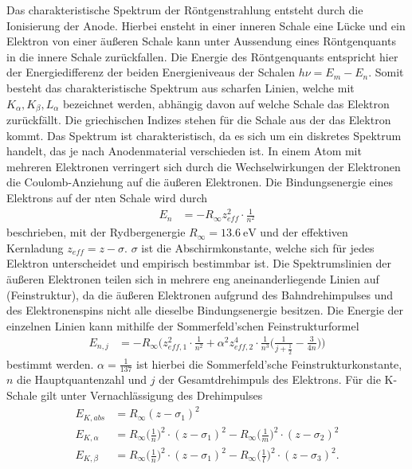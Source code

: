 Das charakteristische Spektrum der Röntgenstrahlung entsteht durch die Ionisierung der Anode.
Hierbei ensteht in einer inneren Schale eine Lücke und ein Elektron von einer äußeren Schale kann unter Aussendung eines Röntgenquants
in die innere Schale zurückfallen. Die Energie des Röntgenquants entspricht hier der Energiedifferenz der beiden Energieniveaus der Schalen
$h \nu = E_m-E_n$. Somit besteht das charakteristische Spektrum aus scharfen Linien, welche mit $K_\alpha, K_\beta, L_\alpha$ bezeichnet werden,
abhängig davon auf welche Schale das Elektron zurückfällt. Die griechischen Indizes stehen für die Schale aus der das Elektron kommt.
Das Spektrum ist charakteristisch, da es sich um ein diskretes Spektrum handelt, das je nach Anodenmaterial verschieden ist.
In einem Atom mit mehreren Elektronen verringert sich durch die Wechselwirkungen der Elektronen die Coulomb-Anziehung auf die äußeren
Elektronen. Die Bindungsenergie eines Elektrons auf der nten Schale wird durch 
\begin{align}
    E_n &= -R_\infty z_{eff}^2 \cdot \frac{1}{n^2} \label{eqn:Bindungsenergie}
\end{align}
beschrieben, mit der Rydbergenergie $R_\infty = \qty{13.6}{\electronvolt}$ und der effektiven Kernladung $z_{eff} = z - \sigma$.
$\sigma$ ist die Abschirmkonstante, welche sich für jedes Elektron unterscheidet und empirisch bestimmbar ist.
Die Spektrumslinien der äußeren Elektronen teilen sich in mehrere eng aneinanderliegende Linien auf (Feinstruktur), da die äußeren
Elektronen aufgrund des Bahndrehimpulses und des Elektronenspins nicht alle dieselbe Bindungsenergie besitzen.
Die Energie der einzelnen Linien kann mithilfe der Sommerfeld'schen Feinstrukturformel
\begin{align}
    E_{n,j} &= -R_\infty \bigl(z_{eff,1}^2 \cdot \frac{1}{n^2} + \alpha^2 z_{eff,2}^4 \cdot \frac{1}{n^3} \bigl(\frac{1}{j+\frac{1}{2}} - \frac{3}{4n}\bigr)\bigr)
    \label{eqn:Sommerfeld}
\end{align}
bestimmt werden.
$\alpha = \frac{1}{137}$ ist hierbei die Sommerfeld'sche Feinstrukturkonstante, $n$ die Hauptquantenzahl und $j$ der Gesamtdrehimpuls des Elektrons.
Für die K-Schale gilt unter Vernachlässigung des Drehimpulses
\begin{align}
    E_{K,abs} &= R_\infty (z-\sigma_1)^2 \label{eqn:Ekabs}\\
    E_{K,\alpha} &= R_\infty \bigl(\frac{1}{n}\bigr)^2 \cdot (z-\sigma_1)^2 - R_\infty \bigl(\frac{1}{m}\bigr)^2 \cdot (z-\sigma_2)^2 \label{eqn:Eka}\\
    E_{K,\beta} &= R_\infty \bigl(\frac{1}{n}\bigr)^2 \cdot (z-\sigma_1)^2 - R_\infty \bigl(\frac{1}{l}\bigr)^2 \cdot (z-\sigma_3)^2. \label{eqn:Ekb}
\end{align}

